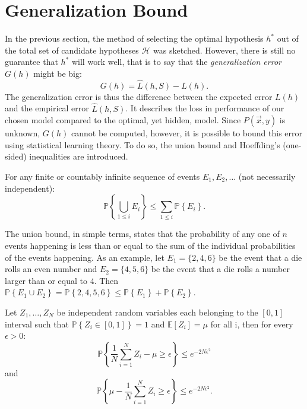\section{Generalization Bound}
\label{sec:generalization_bound}
In the previous section, the method of selecting the optimal hypothesis $h^*$ out of the total set of candidate hypotheses $\mathcal{H}$ was sketched. However, there is still no guarantee that $h^*$ will work well, that is to say that the \emph{generalization error} $G(h)$ might be big:
\begin{equation}
  G(h) = \hat{L}(h, S) - L(h).
\end{equation}
The generalization error is thus the difference between the expected error $L(h)$ and the empirical error $\hat{L}(h, S)$. It describes the loss in performance of our chosen model compared to the optimal, yet hidden, model. Since $P(\vec{x}, y)$ is unknown, $G(h)$ cannot be computed, however, it is possible to bound this error using statistical learning theory. To do so, the union bound and Hoeffding's (one-sided) inequalities are introduced. 
\begin{lemma}
  For any finite or countably infinite sequence of events $E_1, E_2, \dots$ (not necessarily independent): 
  \begin{equation}
    \mathbb{P} \left\{\bigcup_{1 \leq i} E_i \right\} \leq \sum_{1 \leq i} \mathbb{P} \left\{E_i \right \}. 
  \end{equation}
\end{lemma}
The union bound, in simple terms, states that the probability of any one of $n$ events happening is less than or equal to the sum of the individual probabilities of the events happening. As an example, let $E_1=\{2, 4, 6\}$ be the event that a die rolls an even number and $E_2=\{4, 5, 6\}$ be the event that a die rolls a number larger than or equal to $4$. Then $\mathbb{P} \left\{E_1 \cup E_2 \right\} = \mathbb{P} \left\{ 2, 4, 5, 6 \right\} \leq \mathbb{P} \left\{E_1 \right \} + \mathbb{P} \left\{E_2 \right \} $. 
\begin{lemma}
  Let $Z_1, \dots, Z_N$ be independent random variables each belonging to the $[0, 1]$ interval such that $\mathbb{P}\left\{Z_i \in [0, 1] \right\} = 1$ and $\mathbb{E}[Z_i] = \mu$ for all i, then for every $\epsilon > 0$:
  \begin{equation}
    \mathbb{P} \left\{  \frac{1}{N}\sum_{i=1}^N Z_i - \mu \geq \epsilon \right\} \leq e^{-2N\epsilon^2} 
    \label{eq:hoeffding_onesided_a}
  \end{equation}
  and
  \begin{equation}
    \mathbb{P} \left\{ \mu - \frac{1}{N}\sum_{i=1}^N Z_i  \geq \epsilon \right\} \leq e^{-2N\epsilon^2}.
    \label{eq:hoeffding_onesided_b}
  \end{equation}
\end{lemma}
